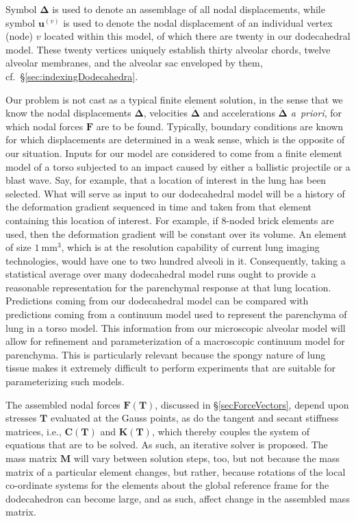 Symbol $\boldsymbol{\Delta}$ is used to denote an assemblage of all nodal displacements, while symbol $\mathbf{u}^{(v)}$ is used to denote the nodal displacement of an individual vertex (node) $v$ located within this model, of which there are twenty in our dodecahedral model.  These twenty vertices uniquely establish thirty alveolar chords, twelve alveolar membranes, and the alveolar sac enveloped by them, cf.\ \S\ref{sec:indexingDodecahedra}.

Our problem is not cast as a typical finite element solution, in the sense that we know the nodal displacements $\boldsymbol{\Delta}$, velocities $\dot{\boldsymbol{\Delta}}$ and accelerations $\ddot{\boldsymbol{\Delta}}$ \textit{a~priori}, for which nodal forces $\boldsymbol{F}$ are to be found.  Typically, boundary conditions are known for which displacements are determined in a weak sense, which is the opposite of our situation. Inputs for our model are considered to come from a finite element model of a torso subjected to an impact caused by either a ballistic projectile or a blast wave.  Say, for example, that a location of interest in the lung has been selected.  What will serve as input to our dodecahedral model will be a history of the deformation gradient sequenced in time and taken from that element containing this location of interest.  For example, if 8-noded brick elements are used, then the deformation gradient will be constant over its volume.  An element of size $1~\text{mm}^3$, which is at the resolution capability of current lung imaging technologies, would have one to two hundred alveoli in it.  Consequently, taking a statistical average over many dodecahedral model runs ought to provide a reasonable representation for the parenchymal response at that lung location.  Predictions coming from our dodecahedral model can be compared with predictions coming from a continuum model used to represent the parenchyma of lung in a torso model.  This information from our micro\-scopic alveolar model will allow for refinement and parameterization of a macro\-scopic continuum model for parenchyma.  This is particularly relevant because the spongy nature of lung tissue makes it extremely difficult to perform experiments that are suitable for parameterizing such models.

The assembled nodal forces $\boldsymbol{F}(\boldsymbol{T})$, discussed in \S\ref{secForceVectors}, depend upon stresses $\boldsymbol{T}$ evaluated at the Gauss points, as do the tangent and secant stiffness matrices, i.e., $\mathbf{C}(\boldsymbol{T})$ and $\mathbf{K}(\boldsymbol{T})$, which thereby couples the system of equations that are to be solved. As such, an iterative solver is proposed.  The mass matrix $\mathbf{M}$ will vary between solution steps, too, but not because the mass matrix of a particular element changes, but rather, because rotations of the local co-ordinate systems for the elements about the global reference frame for the dodecahedron can become large, and as such, affect change in the assembled mass matrix.

